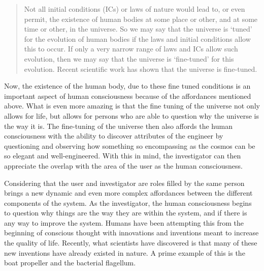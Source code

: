 \begin{quote}
Not all initial conditions (ICs) or laws of nature
would lead to, or even permit, the existence of human bodies at some
place or other, and at some time or other, in the universe. So we may
say that the universe is `tuned' for the evolution of human bodies if
the laws and initial conditions allow this to occur. If only a very
narrow range of laws and ICs allow such evolution, then we may say that
the universe is `fine-tuned' for this evolution. Recent scientific work
has shown that the universe is fine-tuned. \citep{swinburn2004}
\end{quote}

Now, the existence of the human body, due to these fine tuned conditions
is an important aspect of human consciousness because of the
affordances mentioned above. What is even more amazing is that the fine
tuning of the universe not only allows for life, but allows for persons
who are able to question why the universe is the way it is. The
fine-tuning of the universe then also affords the human consciousness
with the ability to discover attributes of the engineer by questioning
and observing how something so encompassing as the cosmos can be so
elegant and well-engineered. With this in mind, the investigator can
then appreciate the overlap with the area of the user as the human
consciousness.

Considering that the user and investigator are roles filled by the same
person brings a new dynamic and even more complex affordances between
the different components of the system. As the investigator, the human
consciousness begins to question why things are the way they are within
the system, and if there is any way to improve the system. Humans have
been attempting this from the beginning of conscious thought with
innovations and inventions meant to increase the quality of life.
Recently, what scientists have discovered is that many of these new
inventions have already existed in nature. A prime example of this is
the boat propeller and the bacterial flagellum. 

